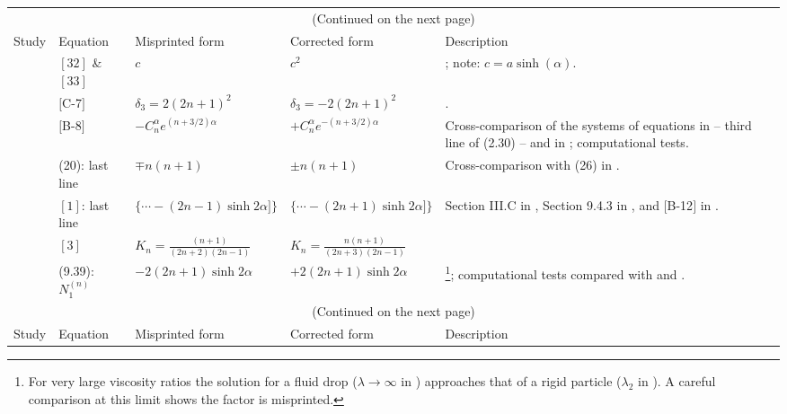 \documentclass[../thesis.tex]{subfiles}
\begin{document}
\begin{landscape}
\begin{longtable}{p{3cm}p{3cm}p{5.0cm}p{5.25cm}p{5.5cm}}
 \multicolumn{5}{c}{(Continued on the next page)}%
 \\ \newpage \hline								 %
 Study & Equation & Misprinted form & Corrected  %
 form & Description \\ \hline					 %
 
 \multirow[t]{3}{3cm}{\cite{HHS73}} & $[32]$ \& $[33]$ & $c$ & $c^2$ & \cite{Z82}; note: \mbox{$c=a\sinh(\alpha)$}.
 \\ \cline{2-5}
 & $[$C-7$]$ & $\delta_3=2(2n+1)^2$ & $\delta_3=-2(2n+1)^2$ & \cite{Z82}.
 \\ \cline{2-5}
 & $[$B-8$]$ & $-C_n^\alpha e^{(n+3/2)\alpha}$ & $+C_n^\alpha e^{-(n+3/2)\alpha}$ & Cross-comparison of the systems of equations in \cite{WW72} -- third line of (2.30) -- and in \cite{HHS73}; computational tests.
 \\ \hline
 
 \cite{RM74} & (20): last line & $\mp n(n+1)$ & $\pm n(n+1)$ & Cross-comparison with (26) in \cite{SJ26}.
 \\ \hline
 
 \cite{BRI78} & $[1]$: last line & $\Big\{\cdots-(2n-1)\sinh2\alpha]\Big\}$ & $\Big\{\cdots-(2n+1)\sinh2\alpha]\Big\}$ & Section III.C in \cite{DSR89}, Section 9.4.3 in \cite{KK13}, and $[$B-12$]$ in \cite{HHS73}.
 \\ \cline{2-4}
 & $[3]$ & $K_n=\frac{(n+1)}{(2n+2)(2n-1)}$ & $K_n=\frac{n(n+1)}{(2n+3)(2n-1)}$ &
 \\ \hline
 
 \cite{KK13} & (9.39): $N_1^{(n)}$ & $-2(2n+1)\sinh2\alpha$ & $+2(2n+1)\sinh2\alpha$ & \footnote{For very large viscosity ratios the solution for a fluid drop ($\lambda\to\infty$ in \cite{KK13}) approaches that of a rigid particle ($\lambda_2$ in \cite{M61}). A careful comparison at this limit shows the factor is misprinted.}\cite{M61}; computational tests compared with \cite{HHS73} and \cite{BRI78}.
 \\ \hline
 
 \multicolumn{5}{c}{(Continued on the next page)}%
 \\ \newpage \hline								 %
 Study & Equation & Misprinted form & Corrected  %
 form & Description \\ \hline					 %


\end{longtable}
\end{landscape}
\end{document}
